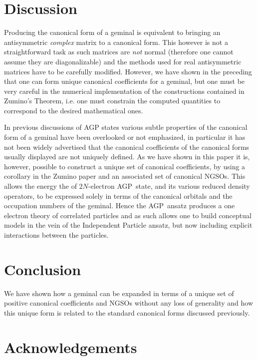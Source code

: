 \documentclass[preprint,aps,showkeys]{revtex4}%
\begin{document}
\section{Discussion\label{discussion}}

Producing the canonical form of a geminal is equivalent to bringing an
antisymmetric \emph{complex} matrix to a canonical form. This however is not a
straightforward task as such matrices are \emph{not }normal (therefore one
cannot assume they are diagonalizable) and the methods used for real
antisymmetric matrices have to be carefully modified. However, we have shown
in the preceding that one can form unique canonical coefficients for a
geminal, but one must be very careful in the numerical implementation of the
constructions contained in Zumino's Theorem, i.e. one must constrain the
computed quantities to correspond to the desired mathematical ones.

In previous discussions of AGP states
\cite{Lindeberg77,Lindeberg79,Weiner85b,Coleman63,Lindeberg80} various subtle
properties of the canonical form of a geminal have been overlooked or not
emphasized, in particular it has not been widely advertised that the canonical
coefficients of the canonical forms usually displayed are not uniquely
defined. As we have shown in this paper it is, however, possible to construct
a unique set of canonical coefficients, by using a corollary in the Zumino
paper \cite{Zumino62} and an associated set of canonical NGSOs. This allows
the energy the of $2N$-electron AGP\ state, and its various reduced density
operators, to be expressed solely in terms of the canonical orbitals and the
occupation numbers of the geminal. Hence the AGP\ ansatz produces a one
electron theory of correlated particles and as such allows one to build
conceptual models in the vein of the Independent Particle ansatz, but now
including explicit interactions between the particles.

\section{Conclusion\label{conclusion}}

We have shown how a geminal can be expanded in terms of a unique set of
positive canonical coefficients and NGSOs without any loss of generality and
how this unique form is related to the standard canonical forms discussed previously.

\section{Acknowledgements}
\end{document}
